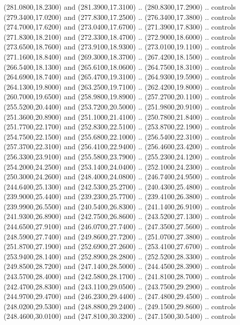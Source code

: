 {\begin{scope}[y=0.80pt, x=0.80pt, yscale=-1, xscale=1, inner sep=0pt, outer sep=0pt, #1]
      (281.0800,18.2300) and (281.3900,17.3100) .. (280.8300,17.2900) .. controls
      (279.3400,17.0200) and (277.8300,17.2500) .. (276.3400,17.3800) .. controls
      (274.7000,17.6200) and (273.0400,17.6700) .. (271.3900,17.8300) .. controls
      (271.8300,18.2100) and (272.3300,18.4700) .. (272.9000,18.6000) .. controls
      (273.6500,18.7600) and (273.9100,18.9300) .. (273.0100,19.1100) .. controls
      (271.1600,18.8400) and (269.3000,18.3700) .. (267.4200,18.1500) .. controls
      (266.5400,18.1300) and (265.6100,18.0600) .. (264.7500,18.3100) .. controls
      (264.6900,18.7400) and (265.4700,19.3100) .. (264.9300,19.5900) .. controls
      (264.1300,19.8000) and (263.2500,19.7100) .. (262.4200,19.8000) .. controls
      (260.7000,19.6500) and (258.9800,19.8900) .. (257.2700,20.1100) .. controls
      (255.5200,20.4400) and (253.7200,20.5000) .. (251.9800,20.9100) .. controls
      (251.3600,20.8900) and (251.1000,21.4100) .. (250.7800,21.8400) .. controls
      (251.7700,22.1700) and (252.8300,22.5100) .. (253.8700,22.1900) .. controls
      (254.7500,22.1500) and (255.6800,22.1000) .. (256.5400,22.3100) .. controls
      (257.3700,22.3100) and (256.4100,22.9400) .. (256.4600,23.4200) .. controls
      (256.3300,23.9100) and (255.5800,23.7900) .. (255.2300,24.1200) .. controls
      (254.2000,24.2500) and (253.1400,24.0400) .. (252.1000,24.2300) .. controls
      (250.3000,24.2600) and (248.4000,24.0800) .. (246.7400,24.9500) .. controls
      (244.6400,25.1300) and (242.5300,25.2700) .. (240.4300,25.4800) .. controls
      (239.9000,25.4400) and (239.2300,25.7700) .. (239.4100,26.3800) .. controls
      (239.9900,26.5500) and (240.5400,26.8300) .. (241.1400,26.9100) .. controls
      (241.9300,26.8900) and (242.7500,26.8600) .. (243.5200,27.1300) .. controls
      (244.6500,27.9100) and (246.0700,27.7400) .. (247.3500,27.5600) .. controls
      (248.5900,27.7400) and (249.8600,27.7200) .. (251.0700,27.3800) .. controls
      (251.8700,27.1900) and (252.6900,27.2600) .. (253.4100,27.6700) .. controls
      (253.9400,28.1400) and (252.8900,28.2800) .. (252.5200,28.3300) .. controls
      (249.8500,28.7200) and (247.1400,28.5000) .. (244.4500,28.3900) .. controls
      (243.5700,28.4000) and (242.5800,28.1700) .. (241.8100,28.7000) .. controls
      (242.4700,28.8300) and (243.1100,29.0500) .. (243.7500,29.2900) .. controls
      (244.9700,29.4700) and (246.2300,29.4400) .. (247.4800,29.4500) .. controls
      (248.0200,29.5300) and (248.8800,29.2400) .. (249.1500,29.8600) .. controls
      (248.4600,30.0100) and (247.8100,30.3200) .. (247.1500,30.5400) .. controls

\end{scope}}
